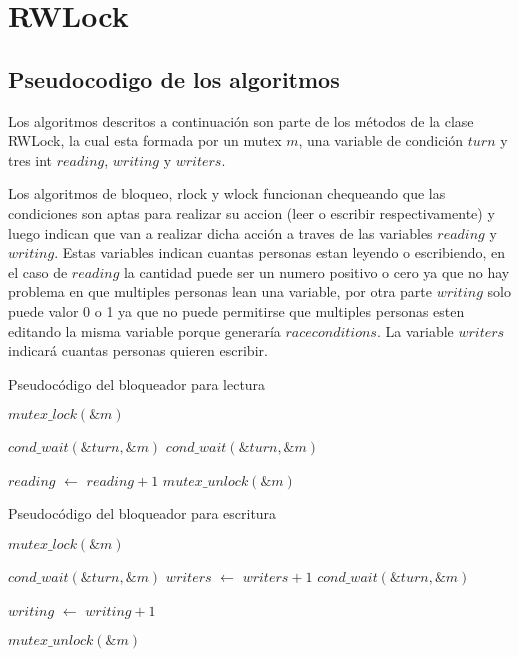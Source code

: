 \section{RWLock}

\subsection{Pseudocodigo de los algoritmos}

Los algoritmos descritos a continuación son parte de los métodos de la clase RWLock, la cual esta formada por un mutex $m$, una variable de condición $turn$ y tres int $reading$, $writing$ y $writers$.

Los algoritmos de bloqueo, rlock y wlock funcionan chequeando que las condiciones son aptas para realizar su accion (leer o escribir respectivamente) y luego indican que van a realizar dicha acción a traves de las variables $reading$ y $writing$. Estas variables indican cuantas personas estan leyendo o escribiendo, en el caso de $reading$ la cantidad puede ser un numero positivo o cero ya que no hay problema en que multiples personas lean una variable, por otra parte $writing$ solo puede valor 0 o 1 ya que no puede permitirse que multiples personas esten editando la misma variable porque generaría $race conditions$. La variable $writers$ indicará cuantas personas quieren escribir.

\begin{algorithm}[H]
  \begin{algorithmic}[1]
  \caption{Pseudocódigo del bloqueador para lectura}
  \label{algo:3-1}
	\State $mutex\_lock(\&m)$

		\State $ cond\_wait(\&turn, \&m) $
	\EndWhile
		\State $ cond\_wait(\&turn, \&m) $
	\EndWhile
	
	\State $reading$ $\leftarrow$ $reading + 1$
	\State $mutex\_unlock(\&m)$

	\EndProcedure
	\end{algorithmic}
\end{algorithm}

\begin{algorithm}[H]
  \begin{algorithmic}[1]
  \caption{Pseudocódigo del bloqueador para escritura}
  \label{algo:3-1}
	\State $mutex\_lock(\&m)$

		\State $ cond\_wait(\&turn, \&m) $
	\EndWhile
	\State $writers$ $\leftarrow$ $writers + 1$
		\State $ cond\_wait(\&turn, \&m) $
	\EndWhile
	
	\State $writing$ $\leftarrow$ $writing + 1$

	\State $mutex\_unlock(\&m)$

	\EndProcedure
	\end{algorithmic}
\end{algorithm}

